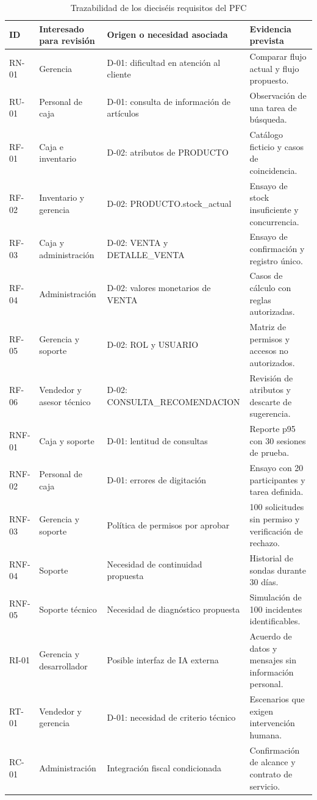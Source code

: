 \begin{table}[!t]
\centering\scriptsize
\caption{Trazabilidad de los dieciséis requisitos del PFC}
\label{tab:trazaCompleta14}
\begin{tabularx}{0.95\textwidth}{@{}P{0.9cm}P{2.5cm}Y P{3.7cm}@{}}
\toprule ID & Interesado para revisión & Origen o necesidad asociada & Evidencia prevista\\\midrule
RN-01 & Gerencia & D-01: dificultad en atención al cliente & Comparar flujo actual y flujo propuesto.\\
RU-01 & Personal de caja & D-01: consulta de información de artículos & Observación de una tarea de búsqueda.\\
RF-01 & Caja e inventario & D-02: atributos de PRODUCTO & Catálogo ficticio y casos de coincidencia.\\
RF-02 & Inventario y gerencia & D-02: PRODUCTO.stock\_actual & Ensayo de stock insuficiente y concurrencia.\\
RF-03 & Caja y administración & D-02: VENTA y DETALLE\_VENTA & Ensayo de confirmación y registro único.\\
RF-04 & Administración & D-02: valores monetarios de VENTA & Casos de cálculo con reglas autorizadas.\\
RF-05 & Gerencia y soporte & D-02: ROL y USUARIO & Matriz de permisos y accesos no autorizados.\\
RF-06 & Vendedor y asesor técnico & D-02: CONSULTA\_RECOMENDACION & Revisión de atributos y descarte de sugerencia.\\
RNF-01 & Caja y soporte & D-01: lentitud de consultas & Reporte p95 con 30 sesiones de prueba.\\
RNF-02 & Personal de caja & D-01: errores de digitación & Ensayo con 20 participantes y tarea definida.\\
RNF-03 & Gerencia y soporte & Política de permisos por aprobar & 100 solicitudes sin permiso y verificación de rechazo.\\
RNF-04 & Soporte & Necesidad de continuidad propuesta & Historial de sondas durante 30 días.\\
RNF-05 & Soporte técnico & Necesidad de diagnóstico propuesta & Simulación de 100 incidentes identificables.\\
RI-01 & Gerencia y desarrollador & Posible interfaz de IA externa & Acuerdo de datos y mensajes sin información personal.\\
RT-01 & Vendedor y gerencia & D-01: necesidad de criterio técnico & Escenarios que exigen intervención humana.\\
RC-01 & Administración & Integración fiscal condicionada & Confirmación de alcance y contrato de servicio.\\
\bottomrule
\end{tabularx}
\end{table}

